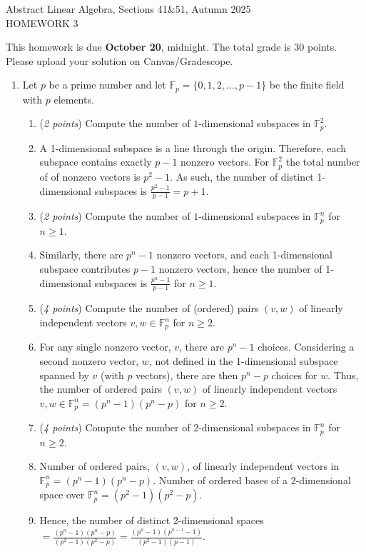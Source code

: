 \documentclass[11pt]{article}
\newcommand{\bbF}{\mathbb{F}}
\newcommand{\head}[1]{
	\begin{center}
		{\large #1}
		\vspace{.2 in}
	\end{center}
	
	\bigskip 
}
\theoremstyle{definition}
\numberwithin{equation}{subsection}
\begin{document}
\pagestyle{plain}


\setcounter{section}{1}   

\head{Abstract Linear Algebra, Sections 41\&51, Autumn 2025\\ HOMEWORK 3} 

This homework is due {\bf October 20}, midnight. The total grade is 30 points. Please upload your solution on Canvas/Gradescope.

\begin{enumerate}

\item Let $p$ be a prime number and let $\mathbb{F}_p=\{0,1,2,\dots, p-1\}$ be the finite field with $p$ elements. 

\begin{enumerate}
\item (\emph{2 points}) Compute the number of $1$-dimensional subspaces in $\bbF_p^2$.
\item[] A 1-dimensional subspace is a line through the origin. Therefore, each subspace contains exactly $p-1$ nonzero vectors. For $\bbF^2_p$ the total number of of nonzero vectors is $p^2-1$. As such, the number of distinct 1-dimensional subspaces is $\frac{p^2-1}{p-1}=p+1$.
\item (\emph{2 points}) Compute the number of $1$-dimensional subspaces in $\bbF_p^n$ for $n\geq 1$.
\item[] Similarly, there are $p^n-1$ nonzero vectors, and each 1-dimensional subspace contributes $p-1$ nonzero vectors, hence the number of 1-dimensional subspaces is $\frac{p^n-1}{p-1}$ for $n\geq1$.
\item (\emph{4 points}) Compute the number of (ordered) pairs $(v,w)$ of linearly independent vectors $v,w \in \bbF_p^n$ for $n\geq 2$.
\item[] For any single nonzero vector, $v$, there are $p^n-1$ choices. Considering a second nonzero vector, $w$, not defined in the 1-dimensional subspace spanned by $v$ (with $p$ vectors), there are then $p^n-p$ choices for $w$. Thus, the number of ordered pairs $(v,w)$ of linearly independent vectors $v,w \in \bbF^n_p = (p^n-1)(p^n-p)$ for $n\geq2$.
\item (\emph{4 points}) Compute the number of $2$-dimensional subspaces in $\bbF_p^n$ for $n\geq 2$.
\item[] Number of ordered pairs, $(v,w)$, of linearly independent vectors in $\bbF^n_p = (p^n-1)(p^n-p)$. Number of ordered bases of a 2-dimensional space over $\bbF^n_p=(p^2-1)(p^2-p)$.
\item[] Hence, the number of distinct 2-dimensional spaces $=\frac{(p^n-1)(p^n-p)}{(p^2-1)(p^2-p)}=\frac{(p^n-1)(p^{n-1}-1)}{(p^2-1)(p-1)}$.
\end{enumerate}


\end{enumerate}
\end{document}
